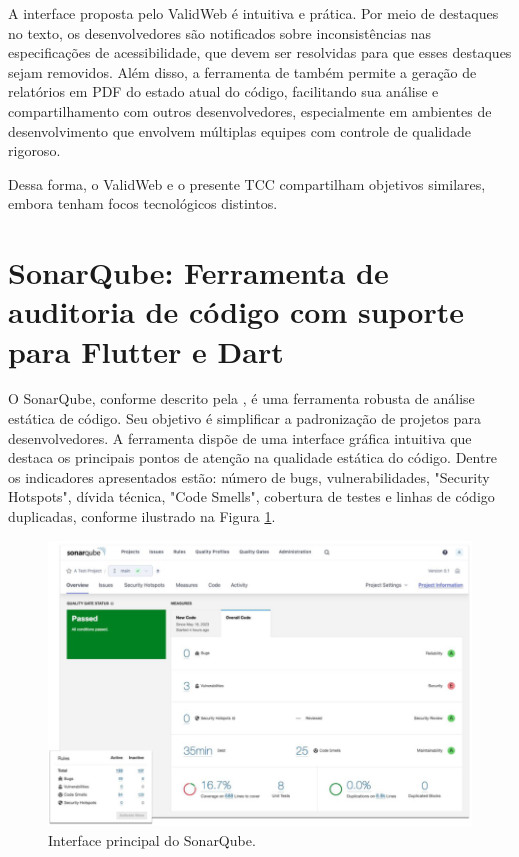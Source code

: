 A interface proposta pelo ValidWeb é intuitiva e prática. Por meio de destaques no texto, os desenvolvedores são notificados sobre inconsistências nas especificações de acessibilidade, que devem ser resolvidas para que esses destaques sejam removidos. Além disso, a ferramenta de \cite{validaweb} também permite a geração de relatórios em PDF do estado atual do código, facilitando sua análise e compartilhamento com outros desenvolvedores, especialmente em ambientes de desenvolvimento que envolvem múltiplas equipes com controle de qualidade rigoroso.

Dessa forma, o ValidWeb e o presente TCC compartilham objetivos similares, embora tenham focos tecnológicos distintos.

\section{SonarQube: Ferramenta de auditoria de código com suporte para Flutter e Dart}

O SonarQube, conforme descrito pela \cite{sonarqube}, é uma ferramenta robusta de análise estática de código. Seu objetivo é simplificar a padronização de projetos para desenvolvedores. A ferramenta dispõe de uma interface gráfica intuitiva que destaca os principais pontos de atenção na qualidade estática do código. Dentre os indicadores apresentados estão: número de bugs, vulnerabilidades, "Security Hotspots", dívida técnica, "Code Smells", cobertura de testes e linhas de código duplicadas, conforme ilustrado na Figura \ref{fig:sonarqube}.

\begin{figure}[!h]
	\centering
	\caption{Interface principal do SonarQube.}
	\label{fig:sonarqube}
	\includegraphics[width=432pt]{Assets/SonarQube.png}
\end{figure}

